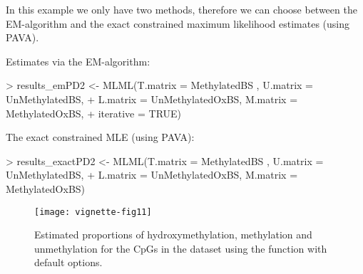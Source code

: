 \documentclass{article}
\begin{document}
In this example we only have two methods, therefore we can choose between the EM-algorithm and the exact constrained maximum likelihood estimates (using PAVA).

Estimates via the EM-algorithm:

\begin{Schunk}
\begin{Sinput}
> results_emPD2 <- MLML(T.matrix = MethylatedBS , U.matrix = UnMethylatedBS,
+                    L.matrix = UnMethylatedOxBS, M.matrix = MethylatedOxBS,
+                    iterative = TRUE)
\end{Sinput}
\end{Schunk}


The exact constrained MLE (using PAVA):

\begin{Schunk}
\begin{Sinput}
> results_exactPD2 <- MLML(T.matrix = MethylatedBS , U.matrix = UnMethylatedBS,
+                       L.matrix = UnMethylatedOxBS, M.matrix = MethylatedOxBS)
\end{Sinput}
\end{Schunk}




\begin{figure*}[h]
 \texttt{[image: vignette-fig11]}
 \caption{\label{fig:fig11} Estimated proportions of hydroxymethylation, methylation and unmethylation for the CpGs in the dataset using the  function with default options.}
\end{figure*}



\end{document}
